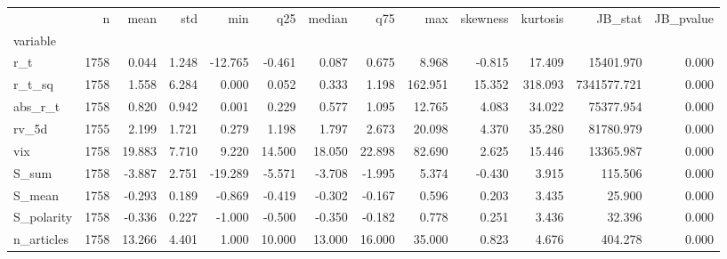 \begin{tabular}{lrrrrrrrrrrrr}
\toprule
 & n & mean & std & min & q25 & median & q75 & max & skewness & kurtosis & JB_stat & JB_pvalue \\
variable &  &  &  &  &  &  &  &  &  &  &  &  \\
\midrule
r_t & 1758 & 0.044 & 1.248 & -12.765 & -0.461 & 0.087 & 0.675 & 8.968 & -0.815 & 17.409 & 15401.970 & 0.000 \\
r_t_sq & 1758 & 1.558 & 6.284 & 0.000 & 0.052 & 0.333 & 1.198 & 162.951 & 15.352 & 318.093 & 7341577.721 & 0.000 \\
abs_r_t & 1758 & 0.820 & 0.942 & 0.001 & 0.229 & 0.577 & 1.095 & 12.765 & 4.083 & 34.022 & 75377.954 & 0.000 \\
rv_5d & 1755 & 2.199 & 1.721 & 0.279 & 1.198 & 1.797 & 2.673 & 20.098 & 4.370 & 35.280 & 81780.979 & 0.000 \\
vix & 1758 & 19.883 & 7.710 & 9.220 & 14.500 & 18.050 & 22.898 & 82.690 & 2.625 & 15.446 & 13365.987 & 0.000 \\
S_sum & 1758 & -3.887 & 2.751 & -19.289 & -5.571 & -3.708 & -1.995 & 5.374 & -0.430 & 3.915 & 115.506 & 0.000 \\
S_mean & 1758 & -0.293 & 0.189 & -0.869 & -0.419 & -0.302 & -0.167 & 0.596 & 0.203 & 3.435 & 25.900 & 0.000 \\
S_polarity & 1758 & -0.336 & 0.227 & -1.000 & -0.500 & -0.350 & -0.182 & 0.778 & 0.251 & 3.436 & 32.396 & 0.000 \\
n_articles & 1758 & 13.266 & 4.401 & 1.000 & 10.000 & 13.000 & 16.000 & 35.000 & 0.823 & 4.676 & 404.278 & 0.000 \\
\bottomrule
\end{tabular}
